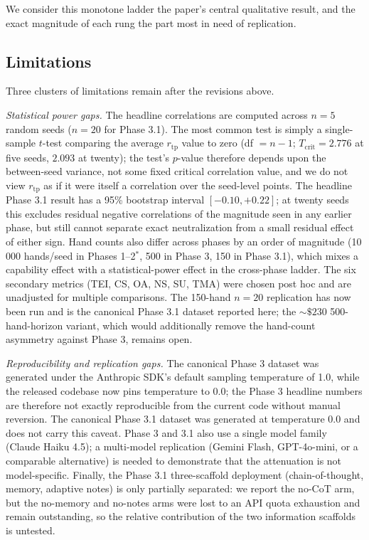 \documentclass[10pt]{article} %
\newcommand{\rtp}{\ensuremath{r_{\mathrm{tp}}}}
\begin{document}
We consider this monotone ladder the paper's central qualitative result, and
the exact magnitude of each rung the part most in need of replication.

\subsection{Limitations}
Three clusters of limitations remain after the revisions above.

\textit{Statistical power gaps.} The headline correlations are computed across $n = 5$ random seeds ($n = 20$ for Phase 3.1). The most common test is simply a single-sample $t$-test comparing the average $\rtp$ value to zero (df $= n-1$; $T_{\text{crit}} = 2.776$ at five seeds, $2.093$ at twenty); the test's
$p$-value therefore depends upon the between-seed variance, not some
fixed critical correlation value, and we do not view $\rtp$ as if it were itself a correlation over the seed-level points. The headline Phase 3.1 result has a 95\% bootstrap interval $[-0.10, +0.22]$; at twenty seeds this excludes residual negative correlations of the magnitude seen in any earlier phase, but still cannot separate exact neutralization from a small residual effect of either sign. Hand counts also differ across phases by an
order of magnitude (10\,000 hands/seed in Phases 1--2$^{*}$, 500
in Phase 3, 150 in Phase 3.1), which mixes a capability effect
with a statistical-power effect in the cross-phase ladder. The
six secondary metrics (TEI, CS, OA, NS, SU, TMA) were chosen
post hoc and are unadjusted for multiple comparisons. The 150-hand $n = 20$ replication has now been run and is the canonical Phase 3.1 dataset reported here; the ${\sim}\$230$ 500-hand-horizon variant, which would additionally remove the hand-count asymmetry against Phase 3, remains open.

\textit{Reproducibility and replication gaps.} The canonical Phase 3 dataset was generated under the Anthropic SDK's default sampling temperature of 1.0, while the released codebase now pins temperature to 0.0; the Phase 3 headline numbers are therefore not exactly reproducible from the current code without manual reversion. The canonical Phase 3.1 dataset was generated at temperature 0.0 and does not carry this caveat. Phase 3 and 3.1 also use a single model family
(Claude Haiku 4.5); a multi-model replication (Gemini Flash,
GPT-4o-mini, or a comparable alternative) is needed to
demonstrate that the attenuation is not model-specific. Finally,
the Phase 3.1 three-scaffold deployment (chain-of-thought, memory, adaptive notes) is only partially separated: we report the no-CoT arm, but the no-memory and no-notes arms were lost to an API quota exhaustion and remain outstanding, so the relative contribution of the two information scaffolds is untested.
\end{document}
